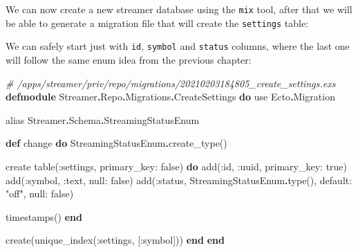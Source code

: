 \documentclass[
  oneside]{book}
\newenvironment{Shaded}{\begin{snugshade}}{\end{snugshade}}
\newcommand{\AttributeTok}[1]{\textcolor[rgb]{0.77,0.63,0.00}{#1}}
\newcommand{\CommentTok}[1]{\textcolor[rgb]{0.56,0.35,0.01}{\textit{#1}}}
\newcommand{\ConstantTok}[1]{\textcolor[rgb]{0.00,0.00,0.00}{#1}}
\newcommand{\ExtensionTok}[1]{#1}
\newcommand{\ImportTok}[1]{#1}
\newcommand{\KeywordTok}[1]{\textcolor[rgb]{0.13,0.29,0.53}{\textbf{#1}}}
\newcommand{\NormalTok}[1]{#1}
\newcommand{\OperatorTok}[1]{\textcolor[rgb]{0.81,0.36,0.00}{\textbf{#1}}}
\newcommand{\StringTok}[1]{\textcolor[rgb]{0.31,0.60,0.02}{#1}}
\newcommand{\VariableTok}[1]{\textcolor[rgb]{0.00,0.00,0.00}{#1}}
\begin{document}
We can now create a new streamer database using the \texttt{mix} tool, after that we will be able to generate a migration file that will create the \texttt{settings} table:

\begin{Shaded}
\end{Shaded}

We can safely start just with \texttt{id}, \texttt{symbol} and \texttt{status} columns, where the last one will follow the same enum idea from the previous chapter:

\begin{Shaded}
\begin{Highlighting}[]
\CommentTok{\# /apps/streamer/priv/repo/migrations/20210203184805\_create\_settings.exs}
\KeywordTok{defmodule} \ConstantTok{Streamer}\OperatorTok{.}\ConstantTok{Repo}\OperatorTok{.}\ConstantTok{Migrations}\OperatorTok{.}\ConstantTok{CreateSettings} \KeywordTok{do}
  \ImportTok{use} \ConstantTok{Ecto}\OperatorTok{.}\ConstantTok{Migration}

  \ImportTok{alias} \ConstantTok{Streamer}\OperatorTok{.}\ConstantTok{Schema}\OperatorTok{.}\ConstantTok{StreamingStatusEnum}

  \KeywordTok{def}\NormalTok{ change }\KeywordTok{do}
    \ConstantTok{StreamingStatusEnum}\OperatorTok{.}\NormalTok{create\_type()}

\NormalTok{    create table(}\VariableTok{:settings}\NormalTok{, }\VariableTok{primary\_key:} \ConstantTok{false}\NormalTok{) }\KeywordTok{do}
\NormalTok{      add(}\VariableTok{:id}\NormalTok{, }\VariableTok{:uuid}\NormalTok{, }\VariableTok{primary\_key:} \ConstantTok{true}\NormalTok{)}
\NormalTok{      add(}\VariableTok{:symbol}\NormalTok{, }\VariableTok{:text}\NormalTok{, }\VariableTok{null:} \ConstantTok{false}\NormalTok{)}
\NormalTok{      add(}\VariableTok{:status}\NormalTok{, }\ConstantTok{StreamingStatusEnum}\OperatorTok{.}\NormalTok{type(), }\VariableTok{default:} \StringTok{"off"}\NormalTok{, }\VariableTok{null:} \ConstantTok{false}\NormalTok{)}
      
\NormalTok{      timestamps()}
    \KeywordTok{end}

\NormalTok{    create(unique\_index(}\VariableTok{:settings}\NormalTok{, [}\VariableTok{:symbol}\NormalTok{]))}
  \KeywordTok{end}
\KeywordTok{end}
\end{Highlighting}
\end{Shaded}
\end{document}
